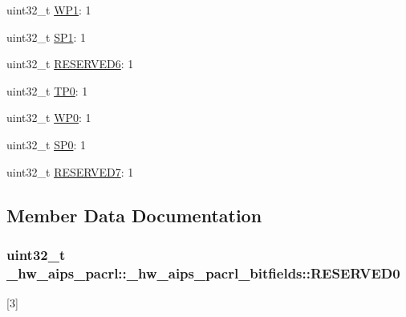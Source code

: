 \begin{DoxyCompactItemize}
\item 
uint32\+\_\+t \hyperlink{struct__hw__aips__pacrl_1_1__hw__aips__pacrl__bitfields_ad3e1af1a029e6049038f038f489f7f61}{W\+P1}\+: 1
\item 
uint32\+\_\+t \hyperlink{struct__hw__aips__pacrl_1_1__hw__aips__pacrl__bitfields_a73ebb2d4f8ca342982a1d66484478be4}{S\+P1}\+: 1
\item 
uint32\+\_\+t \hyperlink{struct__hw__aips__pacrl_1_1__hw__aips__pacrl__bitfields_aa686664a1d4b768248c86adc9d4b83b8}{R\+E\+S\+E\+R\+V\+E\+D6}\+: 1
\item 
uint32\+\_\+t \hyperlink{struct__hw__aips__pacrl_1_1__hw__aips__pacrl__bitfields_add5b997b569d0a05e28c695cc0b141a5}{T\+P0}\+: 1
\item 
uint32\+\_\+t \hyperlink{struct__hw__aips__pacrl_1_1__hw__aips__pacrl__bitfields_ab9d22645e2eba32deea7778631bdc657}{W\+P0}\+: 1
\item 
uint32\+\_\+t \hyperlink{struct__hw__aips__pacrl_1_1__hw__aips__pacrl__bitfields_af6a95037d41bb65f578313b51748300f}{S\+P0}\+: 1
\item 
uint32\+\_\+t \hyperlink{struct__hw__aips__pacrl_1_1__hw__aips__pacrl__bitfields_a366b9d9024e1ae950e0e2eb92d9bf930}{R\+E\+S\+E\+R\+V\+E\+D7}\+: 1
\end{DoxyCompactItemize}


\subsection{Member Data Documentation}
\subsubsection[{\texorpdfstring{R\+E\+S\+E\+R\+V\+E\+D0}{RESERVED0}}]{\setlength{\rightskip}{0pt plus 5cm}uint32\+\_\+t \+\_\+hw\+\_\+aips\+\_\+pacrl\+::\+\_\+hw\+\_\+aips\+\_\+pacrl\+\_\+bitfields\+::\+R\+E\+S\+E\+R\+V\+E\+D0}\hypertarget{struct__hw__aips__pacrl_1_1__hw__aips__pacrl__bitfields_acaec40d9d4a1e23d1c9abf1beb367aa7}{}\label{struct__hw__aips__pacrl_1_1__hw__aips__pacrl__bitfields_acaec40d9d4a1e23d1c9abf1beb367aa7}
\mbox{[}3\mbox{]} 
